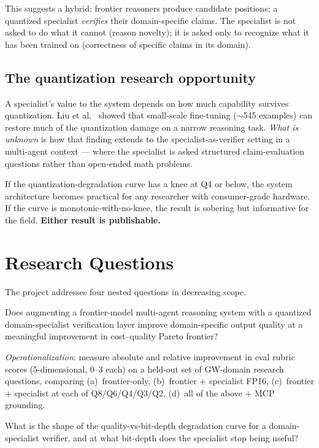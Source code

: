 \documentclass[11pt]{article}
\begin{document}
This suggests a hybrid: frontier reasoners produce candidate positions; a quantized specialist \emph{verifies} their domain-specific claims. The specialist is not asked to do what it cannot (reason novelty); it is asked only to recognize what it has been trained on (correctness of specific claims in its domain).

\subsection{The quantization research opportunity}

A specialist's value to the system depends on how much capability survives quantization. Liu et al.~\cite{liu2025quantmeetsreasoning} showed that small-scale fine-tuning ($\sim$545 examples) can restore much of the quantization damage on a narrow reasoning task. \emph{What is unknown} is how that finding extends to the specialist-as-verifier setting in a multi-agent context --- where the specialist is asked structured claim-evaluation questions rather than open-ended math problems.

If the quantization-degradation curve has a knee at Q4 or below, the system architecture becomes practical for any researcher with consumer-grade hardware. If the curve is monotonic-with-no-knee, the result is sobering but informative for the field. \textbf{Either result is publishable.}

\section{Research Questions}

The project addresses four nested questions in decreasing scope.

Does augmenting a frontier-model multi-agent reasoning system with a quantized domain-specialist verification layer improve domain-specific output quality at a meaningful improvement in cost--quality Pareto frontier?

\textit{Operationalization}: measure absolute and relative improvement in eval rubric scores (5-dimensional, 0--3 each) on a held-out set of GW-domain research questions, comparing (a)~frontier-only, (b)~frontier $+$ specialist FP16, (c)~frontier $+$ specialist at each of Q8/Q6/Q4/Q3/Q2, (d)~all of the above $+$ MCP grounding.

What is the shape of the quality-vs-bit-depth degradation curve for a domain-specialist verifier, and at what bit-depth does the specialist stop being useful?
\end{document}
